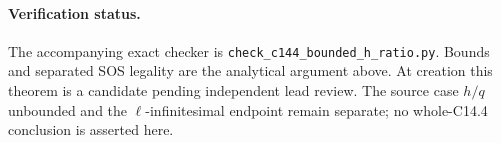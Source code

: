 \paragraph{Verification status.}
The accompanying exact checker is
\texttt{check\_c144\_bounded\_h\_ratio.py}. Bounds and separated
SOS legality are the analytical argument above. At creation this
theorem is a candidate pending independent lead review. The source
case $h/q$ unbounded and the $\ell$-infinitesimal endpoint remain
separate; no whole-C14.4 conclusion is asserted here.
